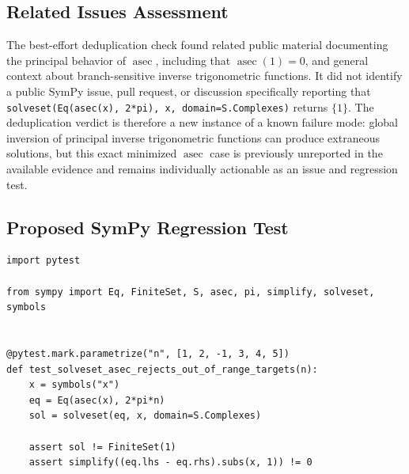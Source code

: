 \documentclass[11pt]{article}
\begin{document}
\subsection{Related Issues Assessment}

The best-effort deduplication check found related public material documenting
the principal behavior of \(\operatorname{asec}\), including that
\(\operatorname{asec}(1)=0\), and general context about branch-sensitive inverse
trigonometric functions.  It did not identify a public SymPy issue, pull
request, or discussion specifically reporting that
\texttt{solveset(Eq(asec(x), 2*pi), x, domain=S.Complexes)} returns
\(\{1\}\).  The deduplication verdict is therefore a new instance of a known
failure mode: global inversion of principal inverse trigonometric functions can
produce extraneous solutions, but this exact minimized \(\operatorname{asec}\)
case is previously unreported in the available evidence and remains
individually actionable as an issue and regression test.

\subsection{Proposed SymPy Regression Test}

\medskip

\begin{lstlisting}[style=bugpython]
import pytest

from sympy import Eq, FiniteSet, S, asec, pi, simplify, solveset, symbols


@pytest.mark.parametrize("n", [1, 2, -1, 3, 4, 5])
def test_solveset_asec_rejects_out_of_range_targets(n):
    x = symbols("x")
    eq = Eq(asec(x), 2*pi*n)
    sol = solveset(eq, x, domain=S.Complexes)

    assert sol != FiniteSet(1)
    assert simplify((eq.lhs - eq.rhs).subs(x, 1)) != 0
\end{lstlisting}
\end{document}
